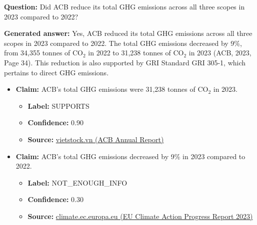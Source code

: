 \documentclass[sn-mathphys, oneside]{sn-jnl}
\begin{document}
\begin{tcolorbox}[colback=white,colframe=black!65,boxrule=0.6pt,arc=0pt,left=8pt,right=8pt,top=8pt,bottom=8pt]

\textbf{Question:} Did ACB reduce its total GHG emissions across all three scopes in 2023 compared to 2022?

\textbf{Generated answer:} Yes, ACB reduced its total GHG emissions across all three scopes in 2023 compared to 2022. The total GHG emissions decreased by 9\%, from 34,355 tonnes of CO$_2$ in 2022 to 31,238 tonnes of CO$_2$ in 2023 (ACB, 2023, Page 34). This reduction is also supported by GRI Standard GRI 305-1, which pertains to direct GHG emissions.

\begin{itemize}
    \item \textbf{Claim:} ACB's total GHG emissions were 31,238 tonnes of CO$_2$ in 2023.
    \begin{itemize}
        \item \textbf{Label:} SUPPORTS
        \item \textbf{Confidence:} 0.90
        \item \textbf{Source:} \href{https://static2.vietstock.vn/vietstock/2025/3/26/20250325_acb_250325_annual_report_2025.pdf}{vietstock.vn (ACB Annual Report)}
    \end{itemize}

    \item \textbf{Claim:} ACB's total GHG emissions decreased by 9\% in 2023 compared to 2022.
    \begin{itemize}
        \item \textbf{Label:} NOT\_ENOUGH\_INFO
        \item \textbf{Confidence:} 0.30
        \item \textbf{Source:} \href{https://climate.ec.europa.eu/news-other-reads/news/climate-action-progress-report-2023-shows-largest-annual-drop-emissions-decades-2024-10-31_en}{climate.ec.europa.eu (EU Climate Action Progress Report 2023)}
    \end{itemize}
\end{itemize}

\end{tcolorbox}
\end{document}
